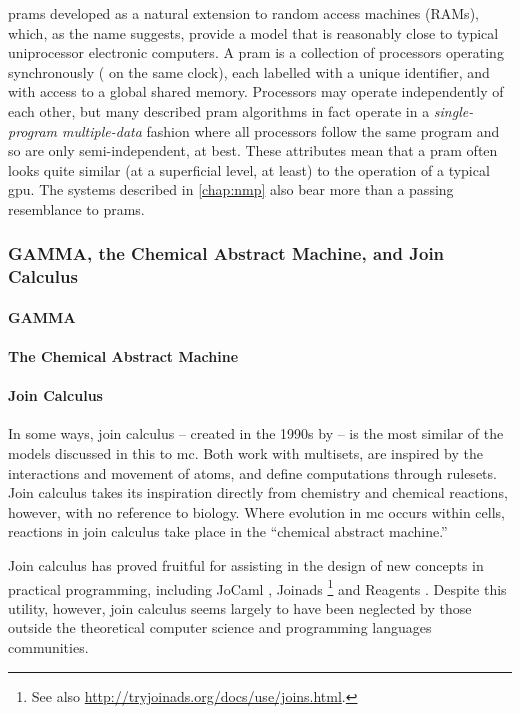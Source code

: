 \Glspl{pram} developed as a natural extension to random access machines (RAMs), which, as the name suggests, provide a model that is reasonably close to typical uniprocessor electronic computers.  A \gls{pram} is a collection of processors operating synchronously (\ie{} on the same clock), each labelled with a unique identifier, and with access to a global shared memory.  Processors may operate independently of each other, but many described \gls{pram} algorithms in fact operate in a \emph{single-program multiple-data} fashion where all processors follow the same program and so are only semi-independent, at best.  These attributes mean that a \gls{pram} often looks quite similar (at a superficial level, at least) to the operation of a typical \gls{gpu}.  The systems described in \cref{chap:nmp} also bear more than a passing resemblance to \glspl{pram}.

\subsubsection{GAMMA, the Chemical Abstract Machine, and Join Calculus}

\paragraph{GAMMA}

\paragraph{The Chemical Abstract Machine}

\paragraph{Join Calculus}
In some ways, join calculus -- created in the 1990s by \citeauthor{Fournet1996} \cite{Fournet1996,Fournet2002} -- is the most similar of the models discussed in this  to \gls{mc}.  Both work with multisets, are inspired by the interactions and movement of atoms, and define computations through rulesets.  Join calculus takes its inspiration directly from chemistry and chemical reactions, however, with no reference to biology.  Where evolution in \gls{mc} occurs within cells, reactions in join calculus take place in the ``chemical abstract machine.''

Join calculus has proved fruitful for assisting in the design of new concepts in practical programming, including JoCaml \cite{Fournet2003}, Joinads \cite{Petricek2011}\footnote{See also \url{http://tryjoinads.org/docs/use/joins.html}.} and Reagents \cite{Turon2012}.  Despite this utility, however, join calculus seems largely to have been neglected by those outside the theoretical computer science and programming languages communities.